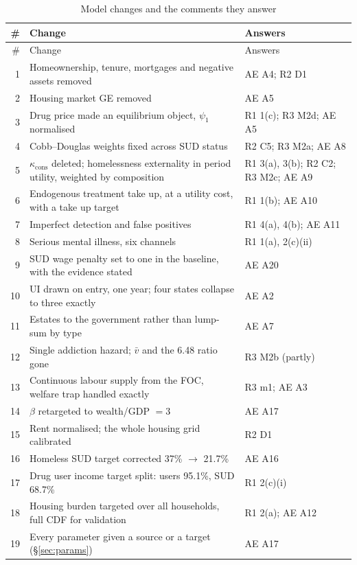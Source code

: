 \documentclass[11pt]{article}
\begin{document}
\begin{longtable}{rL{6.2cm}L{6.4cm}}
\caption{Model changes and the comments they answer}\label{tab:changes}\\
\toprule
\# & Change & Answers\\
\midrule
\endfirsthead
\toprule
\# & Change & Answers\\
\midrule
{} & Homeownership, tenure, mortgages and negative assets removed & AE A4; R2 D1\\
2 & Housing market GE removed & AE A5\\
3 & Drug price made an equilibrium object, $\psi_1$ normalised & R1 1(c); R3 M2d; AE A5\\
4 & Cobb--Douglas weights fixed across SUD status & R2 C5; R3 M2a; AE A8\\
5 & $\kappa_{\text{cons}}$ deleted; homelessness externality in period utility, weighted by composition & R1 3(a), 3(b); R2 C2; R3 M2c; AE A9\\
6 & Endogenous treatment take up, at a utility cost, with a take up target & R1 1(b); AE A10\\
7 & Imperfect detection and false positives & R1 4(a), 4(b); AE A11\\
8 & Serious mental illness, six channels & R1 1(a), 2(c)(ii)\\
9 & SUD wage penalty set to one in the baseline, with the evidence stated & AE A20\\
10 & UI drawn on entry, one year; four states collapse to three exactly & AE A2\\
11 & Estates to the government rather than lump-sum by type & AE A7\\
12 & Single addiction hazard; $\bar v$ and the 6.48 ratio gone & R3 M2b (partly)\\
13 & Continuous labour supply from the FOC, welfare trap handled exactly & R3 m1; AE A3\\
14 & $\beta$ retargeted to wealth/GDP $=3$ & AE A17\\
15 & Rent normalised; the whole housing grid calibrated & R2 D1\\
16 & Homeless SUD target corrected 37\% $\rightarrow$ 21.7\% & AE A16\\
17 & Drug user income target split: users 95.1\%, SUD 68.7\% & R1 2(c)(i)\\
18 & Housing burden targeted over all households, full CDF for validation & R1 2(a); AE A12\\
19 & Every parameter given a source or a target (\S\ref{sec:params}) & AE A17\\

\end{longtable}
\end{document}
